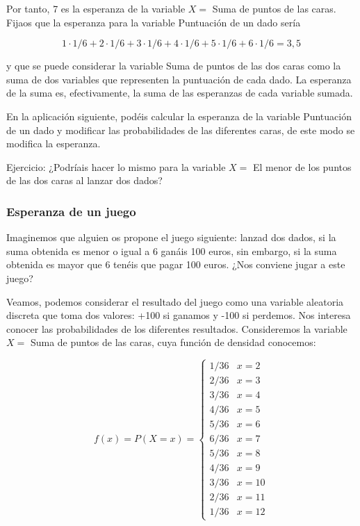 \documentclass[
]{article}
\begin{document}
Por tanto, 7 es la esperanza de la variable \(X=\) Suma de puntos de las
caras. Fijaos que la esperanza para la variable Puntuación de un dado
sería

\[
1 \cdot 1 / 6+2 \cdot 1 / 6+3 \cdot 1 / 6+4 \cdot 1 / 6+5 \cdot 1 / 6+6 \cdot 1 / 6=3,5
\]

y que se puede considerar la variable Suma de puntos de las dos caras
como la suma de dos variables que representen la puntuación de cada
dado. La esperanza de la suma es, efectivamente, la suma de las
esperanzas de cada variable sumada.

En la aplicación siguiente, podéis calcular la esperanza de la variable
Puntuación de un dado y modificar las probabilidades de las diferentes
caras, de este modo se modifica la esperanza.

Ejercicio: ¿Podríais hacer lo mismo para la variable \(X=\) El menor de
los puntos de las dos caras al lanzar dos dados?

\subsubsection{Esperanza de un juego}\label{esperanza-de-un-juego}

Imaginemos que alguien os propone el juego siguiente: lanzad dos dados,
si la suma obtenida es menor o igual a 6 ganáis 100 euros, sin embargo,
si la suma obtenida es mayor que 6 tenéis que pagar 100 euros. ¿Nos
conviene jugar a este juego?

Veamos, podemos considerar el resultado del juego como una variable
aleatoria discreta que toma dos valores: +100 si ganamos y -100 si
perdemos. Nos interesa conocer las probabilidades de los diferentes
resultados. Consideremos la variable \(X=\) Suma de puntos de las caras,
cuya función de densidad conocemos:

\[
f(x)=P(X=x)= \begin{cases}1 / 36 & x=2 \\ 2 / 36 & x=3 \\ 3 / 36 & x=4 \\ 4 / 36 & x=5 \\ 5 / 36 & x=6 \\ 6 / 36 & x=7 \\ 5 / 36 & x=8 \\ 4 / 36 & x=9 \\ 3 / 36 & x=10 \\ 2 / 36 & x=11 \\ 1 / 36 & x=12\end{cases}
\]
\end{document}
